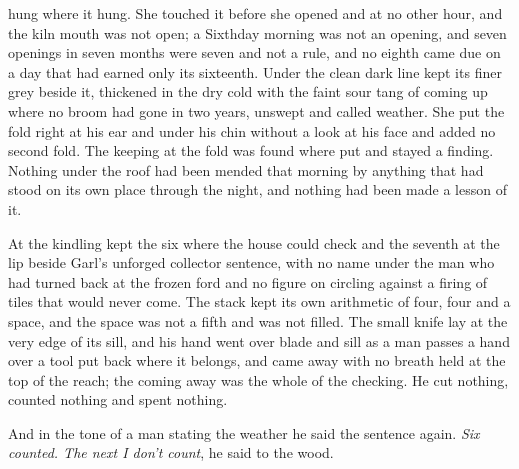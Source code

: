  hung where it hung. She touched it before she opened  and at no other hour, and the kiln mouth was not open; a Sixthday morning was not an opening, and seven openings in seven months were seven and not a rule, and no eighth came due on a day that had earned only its sixteenth. Under  the clean dark line kept its finer grey beside it, thickened in the dry cold with the faint sour tang of  coming up where no broom had gone in two years, unswept and called weather. She put the fold right at his ear and under his chin without a look at his face and added no second fold. The keeping at the fold was found where put and stayed a finding. Nothing under the roof had been mended that morning by anything that had stood on its own place through the night, and nothing had been made a lesson of it.

\scenebreak

At the kindling  kept the six where the house could check and the seventh at the lip beside Garl's unforged collector sentence, with no name under the man who had turned back at the frozen ford and no figure on  circling against a firing of tiles that would never come. The stack kept its own arithmetic of four, four and a space, and the space was not a fifth and was not filled. The small knife lay at the very edge of its sill, and his hand went over blade and sill as a man passes a hand over a tool put back where it belongs, and came away with no breath held at the top of the reach; the coming away was the whole of the checking. He cut nothing, counted nothing and spent nothing.

And in the tone of a man stating the weather he said the sentence again. \emph{Six counted. The next I don't count}, he said to the wood.

